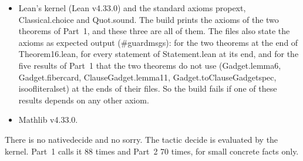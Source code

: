 \documentclass[11pt,a4paper]{article}
\newcommand{\leanus}{\textunderscore\allowbreak}
\newcommand{\lean}[1]{{\ttfamily\let\_\leanus #1}}
\begin{document}
\begin{itemize}
\item Lean's kernel (Lean v4.33.0) and the standard axioms \lean{propext},
\lean{Classical.choice} and \lean{Quot.sound}. The build prints the axioms of
the two theorems of Part~1, and these three are all of them. The files also
state the axioms as expected output (\lean{\#guard\_msgs}): for the two
theorems at the end of \lean{Theorem16.lean}, for every statement of
\lean{Statement.lean} at its end, and for the five results of Part~1 that
the two theorems do not use (\lean{Gadget.lemma6}, \lean{Gadget.fiber\_card},
\lean{ClauseGadget.lemma11}, \lean{Gadget.toClauseGadget\_spec},
\lean{iso\_of\_literal\_set}) at the ends of their files. So the build fails
if one of these results depends on any other axiom.
\item Mathlib v4.33.0.
\end{itemize}
There is no \lean{native\_decide} and no \lean{sorry}. The tactic
\lean{decide} is evaluated by the kernel. Part~1 calls it 88
times and Part~2 70 times, for small concrete facts only.
\end{document}
